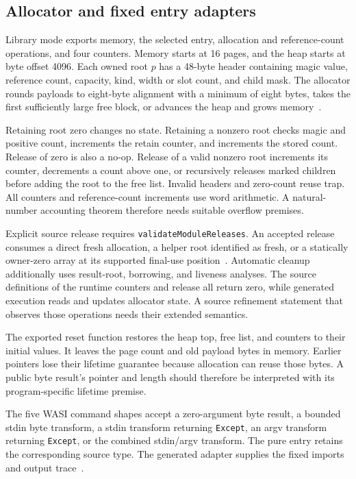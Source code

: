\documentclass[11pt]{article}
\newcommand{\code}[1]{\texttt{#1}}
\begin{document}
\subsection{Allocator and fixed entry adapters}

Library mode exports memory, the selected entry, allocation and reference-count operations, and four counters.  Memory starts at 16 pages, and the heap starts at byte offset 4096.  Each owned root $p$ has a 48-byte header containing magic value, reference count, capacity, kind, width or slot count, and child mask.  The allocator rounds payloads to eight-byte alignment with a minimum of eight bytes, takes the first sufficiently large free block, or advances the heap and grows memory~\cite{binary}.

Retaining root zero changes no state.  Retaining a nonzero root checks magic and positive count, increments the retain counter, and increments the stored count.  Release of zero is also a no-op.  Release of a valid nonzero root increments its counter, decrements a count above one, or recursively releases marked children before adding the root to the free list.  Invalid headers and zero-count reuse trap.  All counters and reference-count increments use word arithmetic.  A natural-number accounting theorem therefore needs suitable overflow premises.

Explicit source release requires \code{validateModuleReleases}.  An accepted release consumes a direct fresh allocation, a helper root identified as fresh, or a statically owner-zero array at its supported final-use position~\cite{release}.  Automatic cleanup additionally uses result-root, borrowing, and liveness analyses.  The source definitions of the runtime counters and release all return zero, while generated execution reads and updates allocator state.  A source refinement statement that observes those operations needs their extended semantics.

The exported reset function restores the heap top, free list, and counters to their initial values.  It leaves the page count and old payload bytes in memory.  Earlier pointers lose their lifetime guarantee because allocation can reuse those bytes.  A public byte result's pointer and length should therefore be interpreted with its program-specific lifetime premise.

The five WASI command shapes accept a zero-argument byte result, a bounded stdin byte transform, a stdin transform returning \code{Except}, an argv transform returning \code{Except}, or the combined stdin/argv transform.  The pure entry retains the corresponding source type.  The generated adapter supplies the fixed imports and output trace~\cite{binary,specification}.
\end{document}
